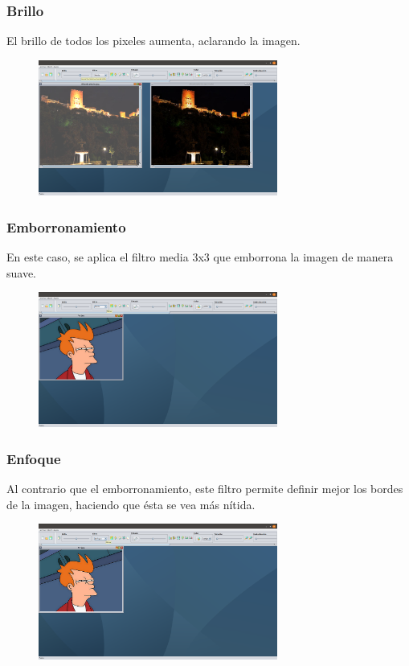 \documentclass[11pt,a4paper]{article}
\begin{document}
\subsubsection{Brillo}
El brillo de todos los pixeles aumenta, aclarando la imagen.

\begin{figure}[H]
\centering
	\includegraphics[width=0.7\textwidth]{img/brillo.png}
\end{figure}

\subsubsection{Emborronamiento}
En este caso, se aplica el filtro media 3x3 que emborrona la imagen de manera suave.

\begin{figure}[H]
\centering
	\includegraphics[width=0.7\textwidth]{img/media.png}
\end{figure}

\subsubsection{Enfoque}
Al contrario que el emborronamiento, este filtro permite definir mejor los bordes de la imagen, haciendo que ésta se vea más nítida.

\begin{figure}[H]
\centering
	\includegraphics[width=0.7\textwidth]{img/enfoque.png}
\end{figure}
\end{document}
